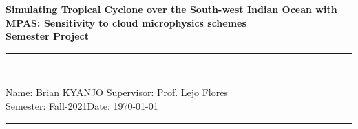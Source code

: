 \documentclass[9pt,a4paper]{article}
\newcommand{\student}{Brian KYANJO }
\newcommand{\course}{Fall-2021}
\newcommand{\assignment}{ Prof. Lejo Flores}
\begin{document}
	
	\thispagestyle{empty}
	\begin{center}
		\textbf{Simulating Tropical Cyclone over the South-west Indian Ocean with
MPAS: Sensitivity to cloud microphysics schemes\\[0.5cm]
			Semester Project}
		\vspace{.2cm}
	\end{center}
	
	
	\begin{center}
		\rule{17cm}{0.2cm}\\[0.3cm]
	\end{center}	
	
	\noindent	Name: \student \hfill Supervisor: \assignment\\[0.1cm]
	Semester: \course \hfill Date: \today\\
	\rule{17cm}{0.05cm}
	\vspace{.2cm}
	
\end{document}
